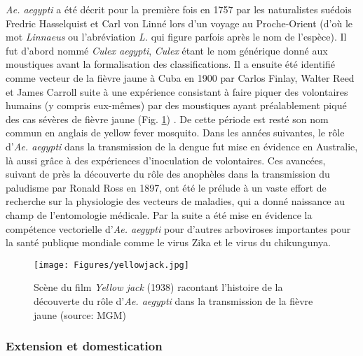 {\em Ae. aegypti} a été décrit pour la première fois en 1757 par les naturalistes suédois Fredric Hasselquist et Carl von Linné lors d'un voyage au Proche-Orient \cite{iterpalestinum1757} (d'où le mot {\em Linnaeus} ou l'abréviation {\em L.} qui figure parfois après le nom de l'espèce). Il fut d'abord nommé {\em Culex aegypti}, {\em Culex} étant le nom générique donné aux moustiques avant la formalisation des classifications.
Il a ensuite été identifié comme vecteur de la fièvre jaune à Cuba en 1900 par Carlos Finlay, Walter Reed et James Carroll suite à une expérience consistant à faire piquer des volontaires humains (y compris eux-mêmes) par des moustiques ayant préalablement piqué des cas sévères de fièvre jaune (Fig. \ref{fig:yellowjack}) \cite{tabachnick1991evolutionary}.
De cette période est resté son nom commun en anglais de \guillemotleft yellow fever mosquito\guillemotright.
Dans les années suivantes, le rôle d'{\em Ae. aegypti} dans la transmission de la dengue fut mise en évidence en Australie, là aussi grâce à des expériences d'inoculation de volontaires.
Ces avancées, suivant de près la découverte du rôle des anophèles dans la transmission du paludisme par Ronald Ross en 1897, ont été le prélude à un vaste effort de recherche sur la physiologie des vecteurs de maladies, qui a donné naissance au champ de l'entomologie médicale.
Par la suite a été mise en évidence la compétence vectorielle d'{\em Ae. aegypti} pour d'autres arboviroses importantes pour la santé publique mondiale comme le virus Zika et le virus du chikungunya.

\begin{figure}[t]
	\centering
	\texttt{[image: Figures/yellowjack.jpg]}
	\caption{Scène du film {\em Yellow jack} (1938) racontant l'histoire de la découverte du rôle d'{\em Ae. aegypti} dans la transmission de la fièvre jaune (source: MGM)}
	\label{fig:yellowjack}
\end{figure}



\subsubsection{Extension et domestication}

